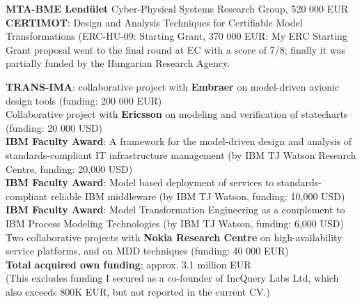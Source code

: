 \documentclass{xetexCV}
\begin{document}
\textbf{MTA-BME Lend\"ulet}  Cyber-Physical Systems Research Group, 520 000 EUR\\

\textbf{CERTIMOT}: Design and Analysis Techniques for
Certifiable Model Transformations (ERC-HU-09: Starting Grant, 370 000 EUR: My
ERC Starting Grant proposal went to the final round at EC with a score of 7/8;
finally it was partially funded by the Hungarian Research Agency.



\textbf{TRANS-IMA}: collaborative project with \textbf{Embraer} on
model-driven avionic design tools (funding: 200 000 EUR) \\

Collaborative project with \textbf{Ericsson} on
modeling and verification of statecharts (funding: 20 000 USD)\\

\textbf{IBM Faculty Award}: A framework for the model-driven design
and analysis of standards-compliant IT infrastructure management (by IBM TJ Watson Research Centre,
funding: 20,000 USD)  \\

\textbf{IBM Faculty Award}: Model based deployment of services to
standards-compliant reliable IBM middleware (by IBM TJ Watson,
funding: 10,000 USD)  \\

\textbf{IBM Faculty Award}: Model Transformation Engineering as a
complement to IBM Process Modeling Technologies (by IBM TJ Watson, 
funding: 6,000 USD)  \\

Two collaborative projects with \textbf{Nokia Research Centre}
on high-availability service platforms, and on MDD%
techniques (funding: 40 000 EUR)\\

\textbf{Total acquired own funding}: approx. 3.1 million EUR \\
(This excludes funding I secured as a co-founder of IncQuery Labs Ltd, which also exceeds 800K EUR, but not reported in the current CV.)
\end{document}
